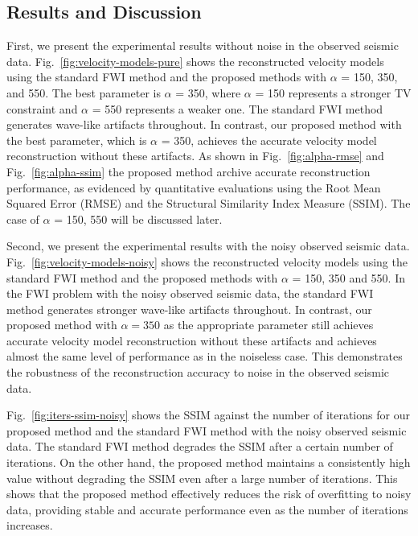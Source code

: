 \subsection{Results and Discussion} \label{subsec:results-and-discussion}
First, we present the experimental results without noise in the observed seismic data.
Fig.~\ref{fig:velocity-models-pure} shows the reconstructed velocity models using the standard FWI method and the proposed methods with $\alpha$ = 150, 350, and 550.
The best parameter is $\alpha$ = 350, where $\alpha$ = 150 represents a stronger TV constraint and $\alpha$ = 550 represents a weaker one.
The standard FWI method generates wave-like artifacts throughout.
In contrast, our proposed method with the best parameter, which is $\alpha$ = 350, achieves the accurate velocity model reconstruction without these artifacts.
As shown in Fig.~\ref{fig:alpha-rmse} and Fig.~\ref{fig:alpha-ssim} the proposed method archive accurate reconstruction performance, as evidenced by quantitative evaluations using the Root Mean Squared Error (RMSE) and the Structural Similarity Index Measure (SSIM).
The case of $\alpha$ = 150, 550 will be discussed later.


Second, we present the experimental results with the noisy observed seismic data.
Fig.~\ref{fig:velocity-models-noisy} shows the reconstructed velocity models using the standard FWI method and the proposed methods with $\alpha$ = 150, 350 and 550.
In the FWI problem with the noisy observed seismic data, the standard FWI method generates stronger wave-like artifacts throughout.
In contrast, our proposed method with $\alpha = 350$ as the appropriate parameter still achieves accurate velocity model reconstruction without these artifacts and achieves almost the same level of performance as in the noiseless case.
This demonstrates the robustness of the reconstruction accuracy to noise in the observed seismic data.

Fig.~\ref{fig:iters-ssim-noisy} shows the SSIM against the number of iterations for our proposed method and the standard FWI method with the noisy observed seismic data.
The standard FWI method degrades the SSIM after a certain number of iterations.
On the other hand, the proposed method maintains a consistently high value without degrading the SSIM even after a large number of iterations.
This shows that the proposed method effectively reduces the risk of overfitting to noisy data, providing stable and accurate performance even as the number of iterations increases.

